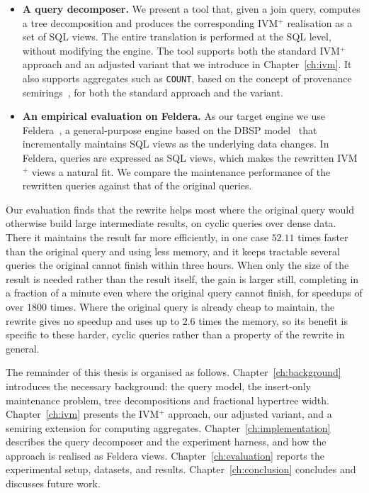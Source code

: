 \begin{itemize}
  \item \textbf{A query decomposer.} 
  We present a tool that, given a join query, computes a tree decomposition and produces the corresponding IVM$^+$ realisation as a set of SQL views.
  The entire translation is performed at the SQL level, without modifying the engine.
  The tool supports both the standard IVM$^+$ approach and an adjusted variant that we introduce in Chapter~\ref{ch:ivm}.
  It also supports aggregates such as \texttt{COUNT}, based on the concept of provenance semirings~\cite{green2007}, for both the standard approach and the variant.

  \item \textbf{An empirical evaluation on Feldera.}
  As our target engine we use Feldera~\cite{feldera2026}, a general-purpose engine based on the DBSP model~\cite{budiu2023DBSP} that incrementally maintains SQL views as the underlying data changes.
  In Feldera, queries are expressed as SQL views, which makes the rewritten IVM$^+$ views a natural fit.
  We compare the maintenance performance of the rewritten queries against that of the original queries.
\end{itemize}

Our evaluation finds that the rewrite helps most where the original query would otherwise build large intermediate results, on cyclic queries over dense data. There it maintains the result far more efficiently, in one case $52.11$ times faster than the original query and using less memory, and it keeps tractable several queries the original cannot finish within three hours. When only the size of the result is needed rather than the result itself, the gain is larger still, completing in a fraction of a minute even where the original query cannot finish, for speedups of over $1800$ times. Where the original query is already cheap to maintain, the rewrite gives no speedup and uses up to $2.6$ times the memory, so its benefit is specific to these harder, cyclic queries rather than a property of the rewrite in general.

\medskip

The remainder of this thesis is organised as follows.
Chapter~\ref{ch:background} introduces the necessary background: the query model, the insert-only maintenance problem, tree decompositions and fractional hypertree width.
Chapter~\ref{ch:ivm} presents the IVM$^+$ approach, our adjusted variant, and a semiring extension for computing aggregates.
Chapter~\ref{ch:implementation} describes the query decomposer and the experiment harness, and how the approach is realised as Feldera views.
Chapter~\ref{ch:evaluation} reports the experimental setup, datasets, and results.
Chapter~\ref{ch:conclusion} concludes and discusses future work.
